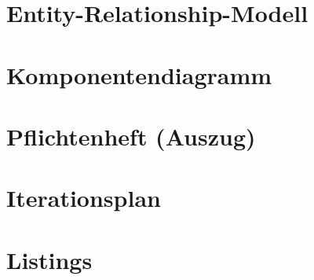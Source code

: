 \begin{appendices}
	\section{Entity-Relationship-Modell}
		
		
	\section{Komponentendiagramm}
		
		
	\section{Pflichtenheft (Auszug)}
		
		
	\section{Iterationsplan}
		
		
	\section{Listings}
		
		
\end{appendices}
